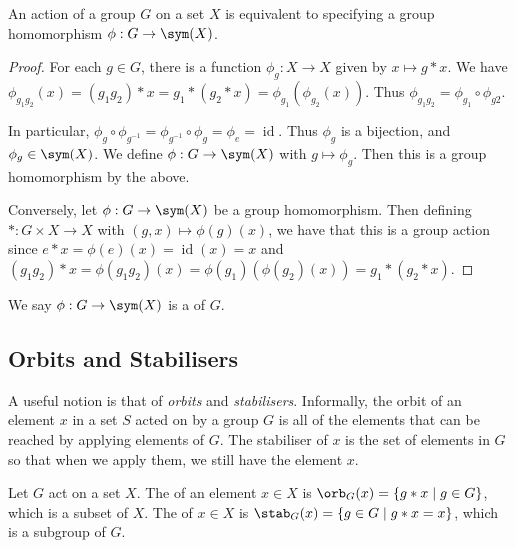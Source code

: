 \documentclass[a4paper]{scrartcl}
\begin{document}
\begin{proposition}
	An action of a group $G$ on a set $X$ is equivalent to specifying a group homomorphism $\phi: G \rightarrow \sym(X)$.
\end{proposition}
\begin{proof}
	For each $g \in G$, there is a function $\phi_g : X \rightarrow X$ given by $x \mapsto g * x$. We have $\phi_{g_1 g_2}(x) = (g_1 g_2) * x = g_1 * (g_2 * x) = \phi_{g_1} (\phi_{g_2}(x))$. Thus $\phi_{g_1 g_2} = \phi_{g_1} \circ \phi_{g2}$.
	
	In particular, $\phi_g \circ \phi_{g^{-1}} = \phi_{g^{-1}} \circ \phi_g = \phi_e = \operatorname{id}$. Thus $\phi_g$ is a bijection, and $\phi_g \in \sym(X)$. We define $\phi : G \rightarrow \sym(X)$ with $g \mapsto \phi_g$. Then this is a group homomorphism by the above.
	
	Conversely, let $\phi : G \rightarrow \sym(X)$ be a group homomorphism. Then defining $*: G \times X \rightarrow X$ with $(g, x) \mapsto \phi(g)(x)$, we have that this is a group action since $e * x = \phi(e)(x) = \operatorname{id}(x) = x$ and $(g_1 g_2) * x = \phi(g_1 g_2)(x) = \phi(g_1)(\phi(g_2)(x)) = g_1 * (g_2 * x)$.
\end{proof}

\begin{definition}
	We say $\phi: G \rightarrow \sym(X)$ is a  of $G$.
\end{definition}

\subsection{Orbits and Stabilisers}

A useful notion is that of \emph{orbits} and \emph{stabilisers}. Informally, the orbit of an element $x$ in a set $S$ acted on by a group $G$ is all of the elements that can be reached by applying elements of $G$. The stabiliser of $x$ is the set of elements in $G$ so that when we apply them, we still have the element $x$.

\begin{definition}
	Let $G$ act on a set $X$. The  of an element $x \in X$ is $\orb_G(x) = \{ g * x \mid g \in G \}$, which is a subset of $X$. The  of $x \in X$ is $\stab_G(x) = \{ g \in G \mid g * x = x \}$, which is a subgroup of $G$.
\end{definition}
\end{document}
